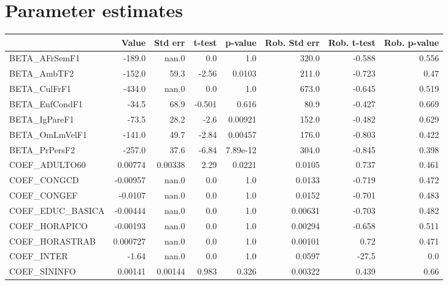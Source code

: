 \section{Parameter estimates}
\begin{tabular}{lrrrrrrr}
\toprule
{} &    Value &  Std err &  t-test &  p-value &  Rob. Std err &  Rob. t-test &  Rob. p-value \\
\midrule
BETA\_AFrSemF1      &   -189.0 &    nan.0 &     0.0 &      1.0 &         320.0 &       -0.588 &         0.556 \\
BETA\_AmbTF2        &   -152.0 &     59.3 &   -2.56 &   0.0103 &         211.0 &       -0.723 &          0.47 \\
BETA\_CulFrF1       &   -434.0 &    nan.0 &     0.0 &      1.0 &         673.0 &       -0.645 &         0.519 \\
BETA\_EnfCondF1     &    -34.5 &     68.9 &  -0.501 &    0.616 &          80.9 &       -0.427 &         0.669 \\
BETA\_IgPareF1      &    -73.5 &     28.2 &    -2.6 &  0.00921 &         152.0 &       -0.482 &         0.629 \\
BETA\_OmLmVelF1     &   -141.0 &     49.7 &   -2.84 &  0.00457 &         176.0 &       -0.803 &         0.422 \\
BETA\_PrPersF2      &   -257.0 &     37.6 &   -6.84 & 7.89e-12 &         304.0 &       -0.845 &         0.398 \\
COEF\_ADULTO60      &  0.00774 &  0.00338 &    2.29 &   0.0221 &        0.0105 &        0.737 &         0.461 \\
COEF\_CONGCD        & -0.00957 &    nan.0 &     0.0 &      1.0 &        0.0133 &       -0.719 &         0.472 \\
COEF\_CONGEF        &  -0.0107 &    nan.0 &     0.0 &      1.0 &        0.0152 &       -0.701 &         0.483 \\
COEF\_EDUC\_BASICA   & -0.00444 &    nan.0 &     0.0 &      1.0 &       0.00631 &       -0.703 &         0.482 \\
COEF\_HORAPICO      & -0.00193 &    nan.0 &     0.0 &      1.0 &       0.00294 &       -0.658 &         0.511 \\
COEF\_HORASTRAB     & 0.000727 &    nan.0 &     0.0 &      1.0 &       0.00101 &         0.72 &         0.471 \\
COEF\_INTER         &    -1.64 &    nan.0 &     0.0 &      1.0 &        0.0597 &        -27.5 &           0.0 \\
COEF\_SININFO       &  0.00141 &  0.00144 &   0.983 &    0.326 &       0.00322 &        0.439 &          0.66 \\

\end{tabular}
